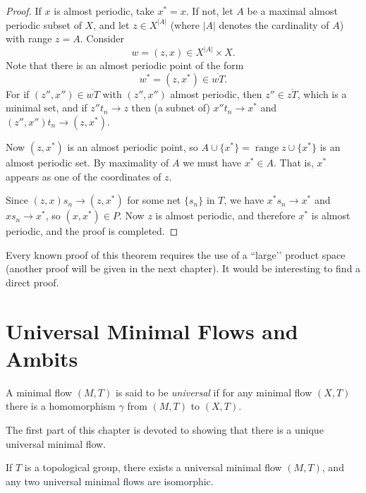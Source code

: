 \begin{proof}
    If $x$ is almost periodic, take $x^*=x$. If not, let $A$ be a maximal  almost periodic subset of $X$, and let $z\in X^{|A|}$ (where $|A|$ denotes the cardinality of $A$) with range $z=A$. Consider
    \[
        w=(z,x)\in X^{|A|}\times X.
    \]
    Note that there is an almost periodic point of the form
    \[
        w^*=(z,x^*)\in \overline{wT}.
    \]
    For if $(z'',x'')\in \overline{wT}$ with $(z'',x'')$ almost periodic, then $z''\in \overline{zT}$, which is a minimal set, and if $z'' t_n \to z$ then (a subnet of) $x'' t_n \to x^*$ and $(z'',x'')t_n \to (z,x^*)$.

    Now $(z,x^*)$ is an almost periodic point, so $A\cup\{x^*\} = \operatorname{range} z \cup\{x^*\}$ is an almost periodic set. By maximality of $A$ we must have $x^* \in A$. That is, $x^*$ appears as one of the coordinates of $z$.

    Since $(z,x)s_n \to (z,x^*)$ for some net $\{s_n\}$ in $T$, we have $x^* s_n \to x^*$ and $x s_n \to x^*$, so $(x,x^*)\in P$. Now $z$ is almost periodic, and therefore $x^*$ is almost periodic, and the proof is completed.
\end{proof}

Every known proof of this theorem requires the use of a “large’’ product space (another proof will be given in the next chapter). It would be interesting to find a direct proof.

















\section{Universal Minimal Flows and Ambits}

A minimal flow $(M,T)$ is said to be \emph{universal} if for any minimal flow $(X,T)$ there is a homomorphism $\gamma$ from $(M,T)$ to $(X,T)$.

The first part of this chapter is devoted to showing that there is a unique universal minimal flow.



\begin{theorem}
    \label{thm:universal_minimal_flow_existence_uniqueness}
    If $T$ is a topological group, there exists a universal minimal flow $(M,T)$, and any two universal minimal flows are isomorphic.
\end{theorem}






